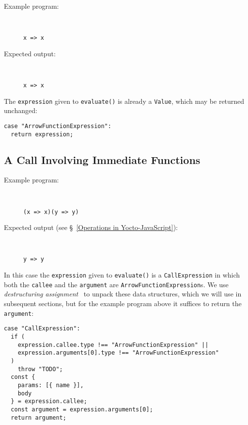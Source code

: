 \documentclass[12pt, oneside]{book}
\begin{document}
\begin{description}
\item [Example program:] ~

\begin{verbatim}
x => x
\end{verbatim}

\item [Expected output:] ~

\begin{verbatim}
x => x
\end{verbatim}
\end{description}

The \texttt{expression} given to \texttt{evaluate()} is already a \texttt{Value}, which may be returned unchanged:

\begin{verbatim}
case "ArrowFunctionExpression":
  return expression;
\end{verbatim}

\subsection{A Call Involving Immediate Functions}

\begin{description}
\item [Example program:] ~

\begin{verbatim}
(x => x)(y => y)
\end{verbatim}

\item [Expected output (see §~\ref{Operations in Yocto-JavaScript}):] ~

\begin{verbatim}
y => y
\end{verbatim}
\end{description}

In this case the \texttt{expression} given to \texttt{evaluate()} is a \texttt{CallExpression} in which both the \texttt{callee} and the \texttt{argument} are \texttt{ArrowFunctionExpression}s. We use \emph{destructuring assignment}~\cite{destructuring-assignment} to unpack these data structures, which we will use in subsequent sections, but for the example program above it suffices to return the \texttt{argument}:

\begin{verbatim}
case "CallExpression":
  if (
    expression.callee.type !== "ArrowFunctionExpression" ||
    expression.arguments[0].type !== "ArrowFunctionExpression"
  )
    throw "TODO";
  const {
    params: [{ name }],
    body
  } = expression.callee;
  const argument = expression.arguments[0];
  return argument;
\end{verbatim}
\end{document}
